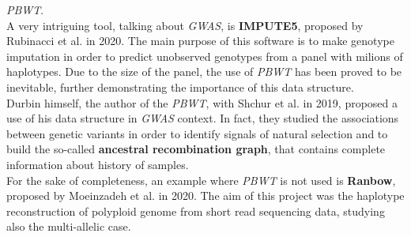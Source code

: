 \documentclass[a4paper,11pt, oneside]{article}
\begin{document}
\textit{PBWT}. \\ 
A very intriguing tool, talking about \textit{GWAS}, is
\textbf{IMPUTE5}, proposed by Rubinacci et al. in 2020. The main purpose of this
software is to make genotype imputation in order to predict unobserved genotypes
from a panel with milions of haplotypes. Due to the size of the panel, the use
of \textit{PBWT} has been proved to be inevitable, further demonstrating the
importance of this data structure.\\
Durbin himself, the author of the \textit{PBWT}, with Shchur et al. in 2019,
proposed a use of his data structure in \textit{GWAS} context. In fact, they
studied the associations between genetic variants in order to identify signals
of natural selection and to build the so-called \textbf{ancestral recombination
  graph}, that contains complete information about history of samples.\\
For the sake of completeness, an example where \textit{PBWT} is not used is
\textbf{Ranbow}, proposed by Moeinzadeh et al. in 2020. The 
aim of this project was the haplotype reconstruction of polyploid genome from
short read sequencing data, studying also the multi-allelic case.
\end{document}
